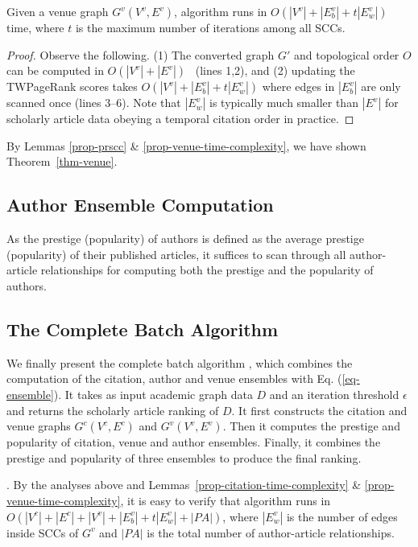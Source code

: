 {\begin{lemma}
\label{prop-venue-time-complexity}
Given a venue graph $G^v(V^v, E^v)$, algorithm \twprscc runs in  $O(|V^v|+|E^v_b|+t|E^v_w|)$ time, where $t$ is  the maximum number of iterations among all SCCs.
\end{lemma}

\begin{proof}
Observe the following. (1) The converted graph $G'$ and topological order $O$ can be computed in $O(|V^v|+|E^v|)$~\cite{CormenLRS01} (lines 1,2), and (2) updating the TWPageRank scores takes $O(|V^v|+|E^v_b|+t |E^v_w|)$ where edges in $|E^v_b|$ are only scanned once (lines 3--6). Note that $|E^v_w|$ is typically much smaller than $|E^v|$ for scholarly article data obeying a temporal citation order in practice.
\end{proof}

By Lemmas \ref{prop-prscc} \& \ref{prop-venue-time-complexity}, we have shown Theorem~\ref{thm-venue}.




\subsection{Author Ensemble Computation}

As the prestige (popularity) of authors is defined as the average prestige (popularity) of their published articles, it suffices to scan through all author-article  relationships for computing both the prestige and the popularity of authors.

\subsection{The Complete Batch Algorithm}
\label{subsec-bat-alg}
We finally present the complete batch algorithm \batensemble, which combines the computation of the citation, author and venue ensembles with Eq. (\ref{eq-ensemble}). It takes as input academic graph data $D$ and an iteration threshold $\epsilon$ and returns the scholarly article ranking of $D$. It first constructs the citation and venue graphs $G^c(V^c,E^c)$ and $G^v(V^v,E^v)$. Then it computes the prestige and popularity of citation, venue and author ensembles.
Finally, it combines the prestige and popularity of three ensembles to produce the final ranking.

. By the analyses above and Lemmas~\ref{prop-citation-time-complexity} \& \ref{prop-venue-time-complexity}, it is easy to verify that algorithm \batensemble runs in $O(|V^c|+|E^c|+|V^v|+|E^v_b|+t|E^v_w|+|PA|)$, where $|E^v_w|$ is the number of edges inside SCCs of $G^v$ and $|PA|$
is the total number of author-article relationships.

}
